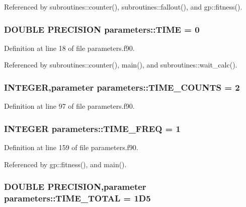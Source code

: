 Referenced by subroutines::counter(), subroutines::fallout(), and gp::fitness().\hypertarget{namespaceparameters_acf1d338d691bf2082aeabaec6ac27263}{
\subsubsection[{TIME}]{\setlength{\rightskip}{0pt plus 5cm}DOUBLE PRECISION {\bf parameters::TIME} = 0}}
\label{namespaceparameters_acf1d338d691bf2082aeabaec6ac27263}


Definition at line 18 of file parameters.f90.

Referenced by subroutines::counter(), main(), and subroutines::wait\_\-calc().\hypertarget{namespaceparameters_a8095a8c543baf08f84d7e538f64f425b}{
\subsubsection[{TIME\_\-COUNTS}]{\setlength{\rightskip}{0pt plus 5cm}INTEGER,parameter {\bf parameters::TIME\_\-COUNTS} = 2}}
\label{namespaceparameters_a8095a8c543baf08f84d7e538f64f425b}


Definition at line 97 of file parameters.f90.\hypertarget{namespaceparameters_a7a6326e37101f07bd6de0fbdd090126b}{
\subsubsection[{TIME\_\-FREQ}]{\setlength{\rightskip}{0pt plus 5cm}INTEGER {\bf parameters::TIME\_\-FREQ} = 1}}
\label{namespaceparameters_a7a6326e37101f07bd6de0fbdd090126b}


Definition at line 159 of file parameters.f90.

Referenced by gp::fitness(), and main().\hypertarget{namespaceparameters_a540e956fa8885214bfcc86f895dc5649}{
\subsubsection[{TIME\_\-TOTAL}]{\setlength{\rightskip}{0pt plus 5cm}DOUBLE PRECISION,parameter {\bf parameters::TIME\_\-TOTAL} = 1D5}}
\label{namespaceparameters_a540e956fa8885214bfcc86f895dc5649}


